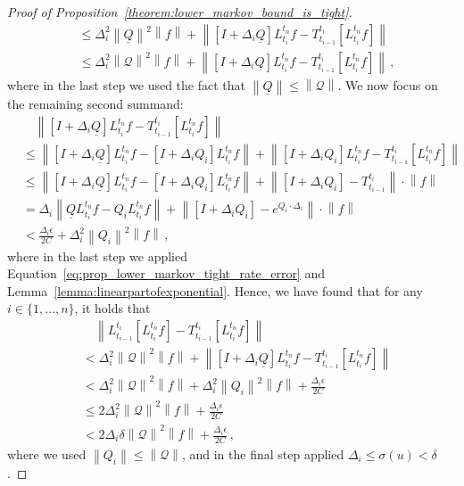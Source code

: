 \documentclass[10pt,a4paper]{paper}
\theoremstyle{definition}
\newcommand{\rateset}{\mathcal{Q}}
\newcommand{\lrate}{\underline{Q}}
\newcommand{\norm}[1]{\left\lVert #1 \right\rVert}
\begin{document}
\begin{proof}[Proof of Proposition~\ref{theorem:lower_markov_bound_is_tight}]
\begin{align*}
&\leq \Delta_i^2\norm{\lrate}^2\norm{f} + \norm{\left[I+\Delta_i\lrate\right]L_{t_i}^{t_n}f - T_{t_{i-1}}^{t_i}\left[L_{t_i}^{t_n}f\right]} \\
&\leq \Delta_i^2\norm{\mathcal{Q}}^2\norm{f} + \norm{\left[I+\Delta_i\lrate\right]L_{t_i}^{t_n}f - T_{t_{i-1}}^{t_i}\left[L_{t_i}^{t_n}f\right]}\,,
\end{align*}
where in the last step we used the fact that $\norm{\lrate}\leq\norm{\rateset}$. We now focus on the remaining second summand:
\begin{align*}
 &\quad \norm{\left[I+\Delta_i\lrate\right]L_{t_i}^{t_n}f - T_{t_{i-1}}^{t_i}\left[L_{t_i}^{t_n}f\right]} \\
 &\leq \norm{\left[I+\Delta_i\lrate\right]L_{t_i}^{t_n}f - \left[I+\Delta_iQ_i\right]L_{t_i}^{t_n}f} + \norm{\left[I+\Delta_iQ_i\right]L_{t_i}^{t_n}f - T_{t_{i-1}}^{t_i}\left[L_{t_i}^{t_n}f\right]} \\
 &\leq \norm{\left[I+\Delta_i\lrate\right]L_{t_i}^{t_n}f - \left[I+\Delta_iQ_i\right]L_{t_i}^{t_n}f} + \norm{\left[I+\Delta_iQ_i\right] - T_{t_{i-1}}^{t_i}}\cdot\norm{f} \\
 &= \Delta_i\norm{\lrate L_{t_i}^{t_n}f - Q_iL_{t_i}^{t_n}f} + \norm{\left[I+\Delta_iQ_i\right] - e^{Q_i\cdot\Delta_i}}\cdot\norm{f} \\
 &< \frac{\Delta_i\epsilon}{2C} + \Delta_i^2\norm{Q_i}^2\norm{f}\,,
\end{align*}
where in the last step we applied Equation~\eqref{eq:prop_lower_markov_tight_rate_error} and Lemma~\ref{lemma:linearpartofexponential}. Hence, we have found that for any $i\in\{1,\ldots,n\}$, it holds that
\begin{align*}
&\quad \norm{L_{t_{i-1}}^{t_i}\left[L_{t_i}^{t_n}f\right] - T_{t_{i-1}}^{t_i}\left[L_{t_i}^{t_n}f\right]} \\
 &< \Delta_i^2\norm{\mathcal{Q}}^2\norm{f} + \norm{\left[I+\Delta_i\lrate\right]L_{t_i}^{t_n}f - T_{t_{i-1}}^{t_i}\left[L_{t_i}^{t_n}f\right]} \\
 &< \Delta_i^2\norm{\mathcal{Q}}^2\norm{f} + \Delta_i^2\norm{Q_i}^2\norm{f} + \frac{\Delta_i\epsilon}{2C} \\
 &\leq 2\Delta_i^2\norm{\mathcal{Q}}^2\norm{f} + \frac{\Delta_i\epsilon}{2C} \\
 &< 2\Delta_i\delta\norm{\mathcal{Q}}^2\norm{f} + \frac{\Delta_i\epsilon}{2C}\,,
\end{align*}
where we used $\norm{Q_i}\leq\norm{\rateset}$, and in the final step applied $\Delta_i\leq\sigma(u)<\delta$.


\end{proof}
\end{document}
